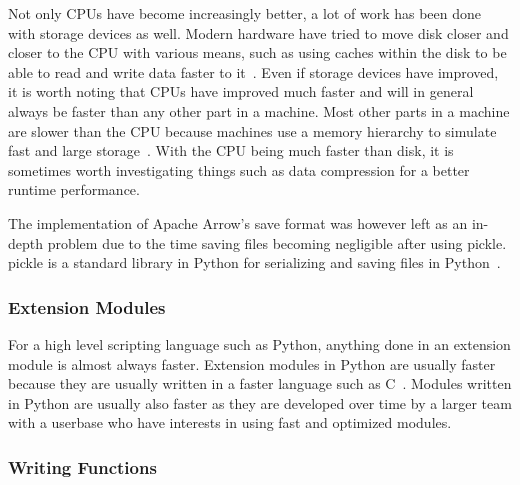 \documentclass[12pt, a4paper]{article}
\begin{document}
Not only CPUs have become increasingly better, a lot of work has been done with storage devices as well.
Modern hardware have tried to move disk closer and closer to the CPU with various means, such as using caches within the disk to be able to read and write data faster to it~\cite{enwiki:1015447262,diskbuffer}.
Even if storage devices have improved, it is worth noting that CPUs have improved much faster and will in general always be faster than any other part in a machine.
Most other parts in a machine are slower than the CPU because machines use a memory hierarchy to simulate fast and large storage~\cite{ComputerMemoryHierarchy, enwiki:memoryHierarchy}.
With the CPU being much faster than disk, it is sometimes worth investigating things such as data compression for a better runtime performance.

The implementation of Apache Arrow's save format was however left as an in-depth problem due to the time saving files becoming negligible after using pickle.
pickle is a standard library in Python for serializing and saving files in Python~\cite{Py:pickle}.

\subsubsection{Extension Modules}
For a high level scripting language such as Python, anything done in an extension module is almost always faster.
Extension modules in Python are usually faster because they are usually written in a faster language such as C~\cite{cFaster}.
Modules written in Python are usually also faster as they are developed over time by a larger team with a userbase who have interests in using fast and optimized modules.

\subsubsection{Writing Functions}
\end{document}
